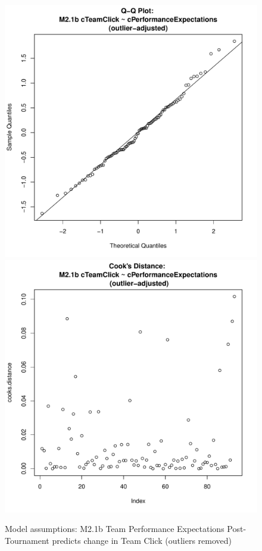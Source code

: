 {\begin{figure}[htbp]
   \includegraphics[scale =.4]{images/MLM21bOutQQNorm.pdf}
   \includegraphics[scale =.4]{images/MLM21bOutCooksD.pdf}
   \caption{Model assumptions: M2.1b Team Performance Expectations Post-Tournament predicts change in Team Click (outliers removed)}
   \label{fig:MLM21bOutAssumptions}
 \end{figure}





}
